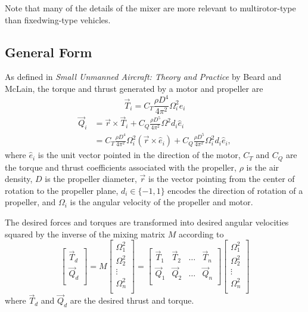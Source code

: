 \documentclass{article}
\begin{document}
Note that many of the details of the mixer are more relevant to multirotor-type than fixedwing-type vehicles.

\subsection{General Form}
As defined in \textit{Small Unmanned Aircraft: Theory and Practice} by Beard and McLain, the torque and thrust generated by a motor and propeller are
\[ \Vec{T}_{i} = C_T \frac{\rho D^4}{4 \pi^2} \Omega_i^2 \hat{e}_i \]
\[\begin{split}
\Vec{Q}_i & = \vec{r} \times \vec{T}_i + C_Q \frac{\rho D^5}{4 \pi^2} \Omega^2 d_i \hat{e}_i \\
          & = C_T \frac{\rho D^4}{4 \pi^2} \Omega_i^2 (\vec{r} \times \hat{e}_i)  + C_Q \frac{\rho D^5}{4 \pi^2} \Omega_i^2 d_i \hat{e}_i,
\end{split}\]
where $\hat{e}_i$ is the unit vector pointed in the direction of the motor, $C_T$ and $C_Q$ are the torque and thrust coefficients associated with the propeller, $\rho$ is the air density, $D$ is the propeller diameter, $\vec{r}$ is the vector pointing from the center of rotation to the propeller plane, $d_i \in \{-1,1\}$ encodes the direction of rotation of a propeller, and $\Omega_i$ is the angular velocity of the propeller and motor.

The desired forces and torques are transformed into desired angular velocities squared by the inverse of the mixing matrix $M$ according to
\[
\begin{bmatrix}
\Vec{T}_d \\ \Vec{Q}_d \\
\end{bmatrix}
=
M
\begin{bmatrix}
    \Omega_1^2 \\ 
    \Omega_2^2 \\
    \vdots \\
    \Omega_n^2 \\
\end{bmatrix}
=
\begin{bmatrix}
    \Vec{T}_1 & \Vec{T}_2 & \hdots & \Vec{T}_n \\
    \Vec{Q}_1 & \Vec{Q}_2 & \hdots & \Vec{Q}_n \\
\end{bmatrix}
\begin{bmatrix}
    \Omega_1^2 \\ 
    \Omega_2^2 \\
    \vdots \\
    \Omega_n^2 \\
\end{bmatrix}
\]
where $\Vec{T}_d$ and $\Vec{Q}_d$ are the desired thrust and torque.
\end{document}
